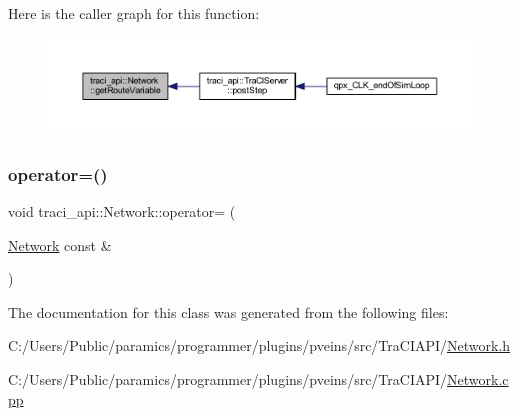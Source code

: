 Here is the caller graph for this function\+:
\nopagebreak
\begin{figure}[H]
\begin{center}
\leavevmode
\includegraphics[width=350pt]{classtraci__api_1_1_network_abc0574b41332ec15856e2e5bb9926be9_icgraph}
\end{center}
\end{figure}
\mbox{\label{classtraci__api_1_1_network_ae6ac9267db1ace8c368a48a7b92ce964}} 
\subsubsection{\texorpdfstring{operator=()}{operator=()}}
{\footnotesize\ttfamily void traci\+\_\+api\+::\+Network\+::operator= (\begin{DoxyParamCaption}\item[{\hyperlink{classtraci__api_1_1_network}{Network} const \&}]{ }\end{DoxyParamCaption})\hspace{0.3cm}{\ttfamily [delete]}}



The documentation for this class was generated from the following files\+:\begin{DoxyCompactItemize}
\item 
C\+:/\+Users/\+Public/paramics/programmer/plugins/pveins/src/\+Tra\+C\+I\+A\+P\+I/\hyperlink{_network_8h}{Network.\+h}\item 
C\+:/\+Users/\+Public/paramics/programmer/plugins/pveins/src/\+Tra\+C\+I\+A\+P\+I/\hyperlink{_network_8cpp}{Network.\+cpp}\end{DoxyCompactItemize}
